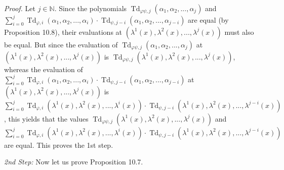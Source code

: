 \documentclass[numbers=enddot,12pt,final,onecolumn,notitlepage]{scrartcl}%
\begin{document}
\textit{Proof.} Let $j\in\mathbb{N}$. Since the polynomials
$\operatorname*{Td}\nolimits_{\varphi\psi,j}\left(  \alpha_{1},\alpha
_{2},...,\alpha_{j}\right)  $ and $\sum\limits_{i=0}^{j}\operatorname*{Td}%
\nolimits_{\varphi,i}\left(  \alpha_{1},\alpha_{2},...,\alpha_{i}\right)
\cdot\operatorname*{Td}\nolimits_{\psi,j-i}\left(  \alpha_{1},\alpha
_{2},...,\alpha_{j-i}\right)  $ are equal (by Proposition 10.8), their
evaluations at $\left(  \lambda^{1}\left(  x\right)  ,\lambda^{2}\left(
x\right)  ,...,\lambda^{j}\left(  x\right)  \right)  $ must also be equal. But
since the evaluation of $\operatorname*{Td}\nolimits_{\varphi\psi,j}\left(
\alpha_{1},\alpha_{2},...,\alpha_{j}\right)  $ at $\left(  \lambda^{1}\left(
x\right)  ,\lambda^{2}\left(  x\right)  ,...,\lambda^{j}\left(  x\right)
\right)  $ is $\operatorname*{Td}\nolimits_{\varphi\psi,j}\left(  \lambda
^{1}\left(  x\right)  ,\lambda^{2}\left(  x\right)  ,...,\lambda^{j}\left(
x\right)  \right)  $, whereas the evaluation of $\sum\limits_{i=0}%
^{j}\operatorname*{Td}\nolimits_{\varphi,i}\left(  \alpha_{1},\alpha
_{2},...,\alpha_{i}\right)  \cdot\operatorname*{Td}\nolimits_{\psi,j-i}\left(
\alpha_{1},\alpha_{2},...,\alpha_{j-i}\right)  $ at $\left(  \lambda
^{1}\left(  x\right)  ,\lambda^{2}\left(  x\right)  ,...,\lambda^{j}\left(
x\right)  \right)  $ is $\sum\limits_{i=0}^{j}\operatorname*{Td}%
\nolimits_{\varphi,i}\left(  \lambda^{1}\left(  x\right)  ,\lambda^{2}\left(
x\right)  ,...,\lambda^{i}\left(  x\right)  \right)  \cdot\operatorname*{Td}%
\nolimits_{\psi,j-i}\left(  \lambda^{1}\left(  x\right)  ,\lambda^{2}\left(
x\right)  ,...,\lambda^{j-i}\left(  x\right)  \right)  $, this yields that the
values $\operatorname*{Td}\nolimits_{\varphi\psi,j}\left(  \lambda^{1}\left(
x\right)  ,\lambda^{2}\left(  x\right)  ,...,\lambda^{j}\left(  x\right)
\right)  $ and $\sum\limits_{i=0}^{j}\operatorname*{Td}\nolimits_{\varphi
,i}\left(  \lambda^{1}\left(  x\right)  ,\lambda^{2}\left(  x\right)
,...,\lambda^{i}\left(  x\right)  \right)  \cdot\operatorname*{Td}%
\nolimits_{\psi,j-i}\left(  \lambda^{1}\left(  x\right)  ,\lambda^{2}\left(
x\right)  ,...,\lambda^{j-i}\left(  x\right)  \right)  $ are equal. This
proves the 1st step.

\textit{2nd Step:} Now let us prove Proposition 10.7.
\end{document}
